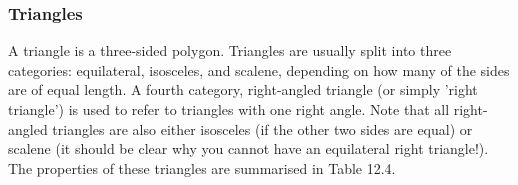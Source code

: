     \addtocounter{footnote}{-0}
    
      \label{m39368*uid38}
            \subsubsection{ Triangles}
            \nopagebreak
            \label{m39368*id317485}A triangle is a three-sided polygon. Triangles are usually split into three categories: equilateral, isosceles, and scalene, depending on how many of the sides are of equal length. A fourth category, right-angled triangle (or simply 'right triangle') is used to refer to triangles with one right angle. Note that all right-angled triangles are also either isosceles (if the other two sides are equal) or scalene (it should be clear why you cannot have an equilateral right triangle!). The properties of these triangles are summarised in Table 12.4.\par 
        
    
      
    
    \setlength\mytablespace{6\tabcolsep}
    \addtolength\mytablespace{4\arrayrulewidth}
    \setlength\mytablewidth{\linewidth}
        
    
    \setlength\mytableroom{\mytablewidth}
    \addtolength\mytableroom{-\mytablespace}
    
    \setlength\myfixedwidth{0pt}
    \setlength\mystarwidth{\mytableroom}
        \addtolength\mystarwidth{-\myfixedwidth}
        \divide{}
        
    
            
    
